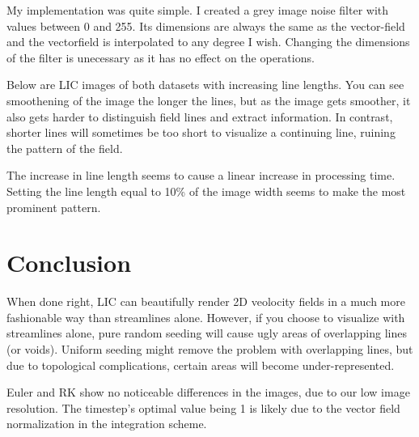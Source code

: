 \documentclass[a4paper,10pt]{report}
\begin{document}
My implementation was quite simple. I created a grey image noise filter with values between 0 and 255. Its dimensions are always the same as the vector-field and the vectorfield is interpolated to any degree I wish.
Changing the dimensions of the filter is unecessary as it has no effect on the operations. 

Below are LIC images of both datasets with increasing line lengths. You can see smoothening of the image the longer the lines, but as the image gets smoother, it also gets harder to distinguish field lines and extract information.
In contrast, shorter lines will sometimes be too short to visualize a continuing line, ruining the pattern of the field.

The increase in line length seems to cause a linear increase in processing time.
Setting the line length equal to 10\% of the image width seems to make the most prominent pattern. 

\section*{Conclusion}
When done right, LIC can beautifully render 2D veolocity fields in a much more fashionable way than streamlines alone. 
However, if you choose to visualize with streamlines alone, pure random seeding will cause ugly areas of
overlapping lines (or voids). Uniform seeding might remove the problem with overlapping lines, but due to topological complications, certain areas will become under-represented.

Euler and RK show no noticeable differences in the images, due to our low image resolution. The timestep's optimal value being 1 is 
likely due to the vector field normalization in the integration scheme.
\end{document}
